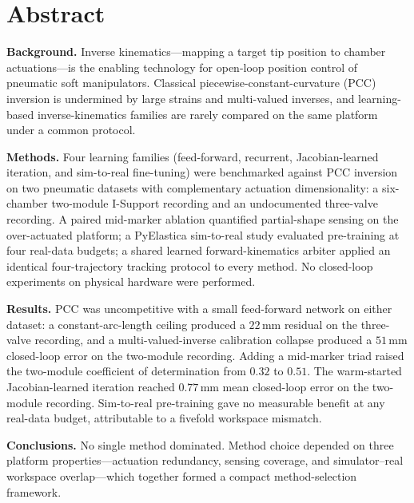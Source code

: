 \chapter{Abstract}
\thispagestyle{plain}

\noindent\textbf{Background.} Inverse kinematics---mapping a target tip position to chamber actuations---is the enabling technology for open-loop position control of pneumatic soft manipulators. Classical piecewise-constant-curvature (PCC) inversion is undermined by large strains and multi-valued inverses, and learning-based inverse-kinematics families are rarely compared on the same platform under a common protocol.

\textbf{Methods.} Four learning families (feed-forward, recurrent, Jacobian-learned iteration, and sim-to-real fine-tuning) were benchmarked against PCC inversion on two pneumatic datasets with complementary actuation dimensionality: a six-chamber two-module I-Support recording and an undocumented three-valve recording. A paired mid-marker ablation quantified partial-shape sensing on the over-actuated platform; a PyElastica sim-to-real study evaluated pre-training at four real-data budgets; a shared learned forward-kinematics arbiter applied an identical four-trajectory tracking protocol to every method. No closed-loop experiments on physical hardware were performed.

\textbf{Results.} PCC was uncompetitive with a small feed-forward network on either dataset: a constant-arc-length ceiling produced a $22$\,mm residual on the three-valve recording, and a multi-valued-inverse calibration collapse produced a $51$\,mm closed-loop error on the two-module recording. Adding a mid-marker triad raised the two-module coefficient of determination from $0.32$ to $0.51$. The warm-started Jacobian-learned iteration reached $0.77$\,mm mean closed-loop error on the two-module recording. Sim-to-real pre-training gave no measurable benefit at any real-data budget, attributable to a fivefold workspace mismatch.

\textbf{Conclusions.} No single method dominated. Method choice depended on three platform properties---actuation redundancy, sensing coverage, and simulator--real workspace overlap---which together formed a compact method-selection framework.
